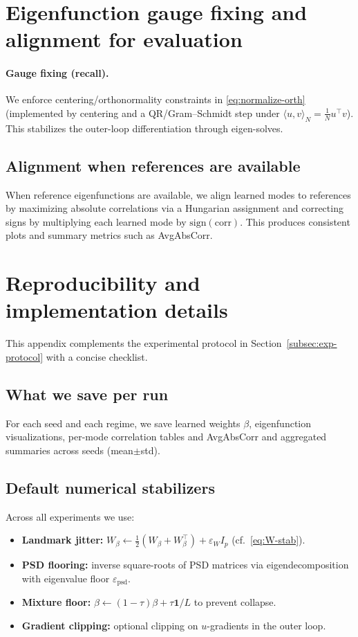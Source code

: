 \documentclass[11pt]{article}
\theoremstyle{remark}
\begin{document}
\section{Eigenfunction gauge fixing and alignment for evaluation}
\label{app:anchoring}

\paragraph{Gauge fixing (recall).}
We enforce centering/orthonormality constraints in \eqref{eq:normalize-orth} (implemented by centering and a QR/Gram--Schmidt step under
$\langle u,v\rangle_N=\tfrac1N u^\top v$). This stabilizes the outer-loop differentiation through eigen-solves.

\subsection{Alignment when references are available}
\label{app:alignment}

When reference eigenfunctions are available, we align learned modes to references by maximizing absolute correlations via a Hungarian assignment and correcting signs by multiplying each learned mode by $\mathrm{sign}(\mathrm{corr})$.
This produces consistent plots and summary metrics such as AvgAbsCorr.

\section{Reproducibility and implementation details}
\label{app:impl}

This appendix complements the experimental protocol in Section~\ref{subsec:exp-protocol} with a concise checklist.

\subsection{What we save per run}
For each seed and each regime, we save learned weights $\beta$, eigenfunction visualizations, per-mode correlation tables and AvgAbsCorr and
aggregated summaries across seeds (mean$\pm$std).

\subsection{Default numerical stabilizers}
Across all experiments we use:
\begin{itemize}
\item \textbf{Landmark jitter:} $W_\beta \leftarrow \tfrac12(W_\beta+W_\beta^\top)+\varepsilon_W I_p$ (cf.\ \eqref{eq:W-stab}).
\item \textbf{PSD flooring:} inverse square-roots of PSD matrices via eigendecomposition with eigenvalue floor $\varepsilon_{\mathrm{psd}}$.
\item \textbf{Mixture floor:} $\beta \leftarrow (1-\tau)\beta+\tau\mathbf{1}/L$ to prevent collapse.
\item \textbf{Gradient clipping:} optional clipping on $u$-gradients in the outer loop.
\end{itemize}
\end{document}
